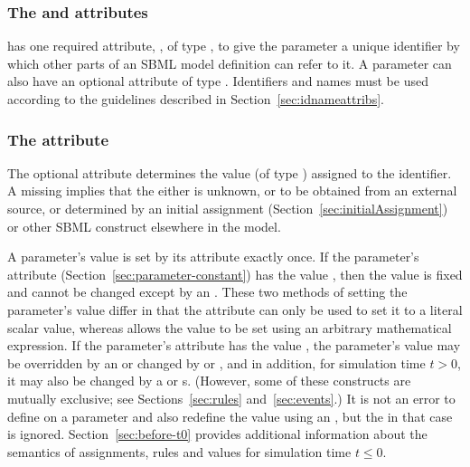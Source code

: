 \subsubsection{The  and  attributes}

\Parameter has one required attribute, , of type
, to give the parameter a unique identifier by which
other parts of an SBML model definition can refer to it.  A
parameter can also have an optional  attribute of type
.  Identifiers and names must be used according
to the guidelines described in Section~\ref{sec:idnameattribs}.


\subsubsection{The  attribute}
\label{sec:parameter-value}


The optional attribute  determines the value (of type
) assigned to the identifier.  A missing
 implies that the  either is unknown, or
to be obtained from an external source, or determined by an
initial assignment (Section~\ref{sec:initialAssignment}) or 
other SBML construct elsewhere in the model.

A parameter's value is set by its  attribute exactly
once.  If the parameter's  attribute
(Section~\ref{sec:parameter-constant}) has the value ,
then the value is fixed and cannot be changed except by an
\InitialAssignment.  These two methods of setting the parameter's
value differ in that the  attribute can only be used
to set it to a literal scalar value, whereas \InitialAssignment
allows the value to be set using an arbitrary mathematical
expression.  If the parameter's  attribute has the
value , the parameter's value may be overridden by an
\InitialAssignment or changed by \AssignmentRule or
\AlgebraicRule, and in addition, for simulation time $t > 0$, it
may also be changed by a \RateRule or \Event{}s.  (However, some
of these constructs are mutually exclusive; see
Sections~\ref{sec:rules} and~\ref{sec:events}.)  It is not an
error to define  on a parameter and also redefine the
value using an \InitialAssignment, but the  in that
case is ignored.  Section~\ref{sec:before-t0} provides additional
information about the semantics of assignments, rules and values
for simulation time $t \leq 0$.


